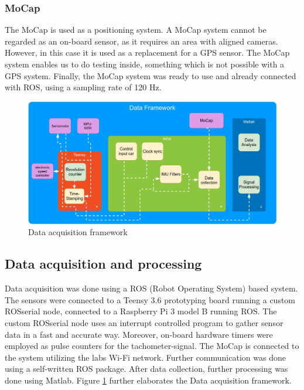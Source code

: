 \subsubsection{MoCap}
The MoCap is used as a positioning system. A MoCap system cannot be regarded as an on-board sensor, as it requires an area with aligned cameras. However, in this case it is used as a replacement for a GPS sensor. The MoCap system enables us to do testing inside, something which is not possible with a GPS system. Finally, the MoCap system was ready to use and already connected with ROS, using a sampling rate of 120 Hz.

\begin{figure}
  \centering
    \includegraphics[scale=0.40]{figure/DataFramework__1_.jpg}
  \caption{Data acquisition framework}
  \label{fig:DonutFramework} 
\end{figure}

\subsection{Data acquisition and processing}
Data acquisition was done using a ROS (Robot Operating System) based system. The sensors were connected to a Teensy 3.6 prototyping board running a custom ROSserial node, connected to a Raspberry Pi 3 model B running ROS. The custom ROSserial node uses an interrupt controlled program to gather sensor data in a fast and accurate way. Moreover, on-board hardware timers were employed as pulse counters for the tachometer-signal.
The MoCap is connected to the system utilizing the labs Wi-Fi network. Further communication was done using a self-written ROS package. After data collection, further processing was done using Matlab. Figure
\ref{fig:DonutFramework} further elaborates the Data acquisition framework.

